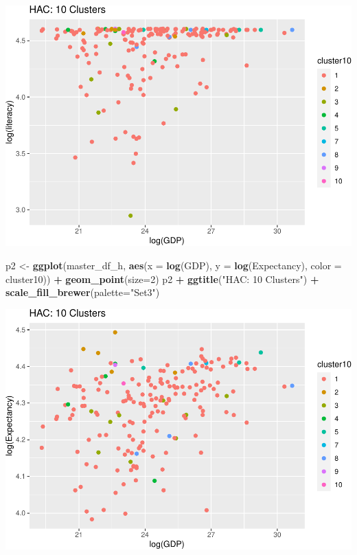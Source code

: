 \documentclass[]{article}
\newenvironment{Shaded}{\begin{snugshade}}{\end{snugshade}}
\newcommand{\DataTypeTok}[1]{\textcolor[rgb]{0.13,0.29,0.53}{#1}}
\newcommand{\DecValTok}[1]{\textcolor[rgb]{0.00,0.00,0.81}{#1}}
\newcommand{\KeywordTok}[1]{\textcolor[rgb]{0.13,0.29,0.53}{\textbf{#1}}}
\newcommand{\NormalTok}[1]{#1}
\newcommand{\OperatorTok}[1]{\textcolor[rgb]{0.81,0.36,0.00}{\textbf{#1}}}
\newcommand{\StringTok}[1]{\textcolor[rgb]{0.31,0.60,0.02}{#1}}
\begin{document}
\includegraphics{eda_files/figure-latex/unnamed-chunk-31-4.pdf}

\begin{Shaded}
\begin{Highlighting}[]
\NormalTok{p2 <-}\StringTok{ }\KeywordTok{ggplot}\NormalTok{(master_df_h, }\KeywordTok{aes}\NormalTok{(}\DataTypeTok{x =} \KeywordTok{log}\NormalTok{(GDP), }\DataTypeTok{y =} \KeywordTok{log}\NormalTok{(Expectancy), }\DataTypeTok{color =}\NormalTok{ cluster10)) }\OperatorTok{+}
\StringTok{  }\KeywordTok{geom_point}\NormalTok{(}\DataTypeTok{size=}\DecValTok{2}\NormalTok{)}
\NormalTok{p2 }\OperatorTok{+}\StringTok{ }\KeywordTok{ggtitle}\NormalTok{(}\StringTok{"HAC: 10 Clusters"}\NormalTok{) }\OperatorTok{+}\StringTok{ }\KeywordTok{scale_fill_brewer}\NormalTok{(}\DataTypeTok{palette=}\StringTok{"Set3"}\NormalTok{)}
\end{Highlighting}
\end{Shaded}

\includegraphics{eda_files/figure-latex/unnamed-chunk-31-5.pdf}
\end{document}
